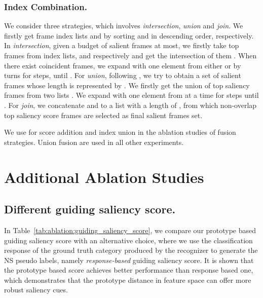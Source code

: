 \documentclass[runningheads]{llncs}
\newcommand{\tabref}[1]{Table~\ref{#1}}
\begin{document}
\subsubsection{Index Combination.}
We consider three strategies, which involves \textit{intersection}, \textit{union} and \textit{join}. We firstly get frame index lists  and  by sorting  and  in descending order, respectively. In \textit{intersection}, given a budget of  salient frames at most, we firstly take top  frames from index lists,  and  respectively and get the intersection of them . When there exist coincident frames, we expand  with one element from either  or  by turns for  steps, until . For \textit{union}, following \cite{scsampler19}, we try to obtain a set of salient frames whose length is represented by . We firstly get the union of top saliency frames from two lists . We expand  with one element from  at a time for  steps until . For \textit{join}, we concatenate  and  to a list with a length of , from which  non-overlap top saliency score frames are selected as final salient frames set.

We use  for score addition and index union in the ablation studies of fusion strategies. Union fusion are used in all other experiments. 

\section{Additional Ablation Studies} \label{appendix:ablation}




\subsection{Different guiding saliency score.}
In \tabref{tab:ablation:guiding_saliency_score}, we compare our prototype based guiding saliency score with an alternative choice, where we use the classification response of the ground truth category produced by the recognizer to generate the NS pseudo labels, namely \emph{response-based} guiding saliency score. It is shown that the prototype based score achieves better performance than response based one, which demonstrates that the prototype distance in feature space can offer more robust saliency cues.
\begin{table}[h]
\centering
\caption{Performance of different guiding saliency score in FS module.}
\renewcommand{\arraystretch}{1.15}
\label{tab:ablation:guiding_saliency_score}
\end{table} 
\end{document}
